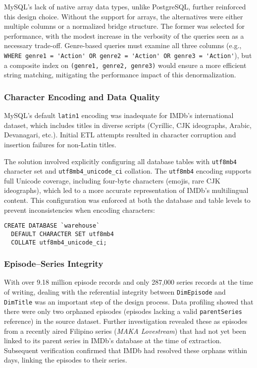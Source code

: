 MySQL's lack of native array data types, unlike PostgreSQL, further reinforced this design choice. Without the support for arrays, the alternatives were either multiple columns or a normalized bridge structure. The former was selected for performance, with the modest increase in the verbosity of the queries seen as a necessary trade-off. Genre-based queries must examine all three columns (e.g., \verb|WHERE genre1 = 'Action' OR genre2 = 'Action' OR genre3 = 'Action'|), but a composite index on \verb|(genre1, genre2, genre3)| would ensure a more efficient string matching, mitigating the performance impact of this denormalization.

\subsubsection{Character Encoding and Data Quality}

MySQL's default \verb|latin1| encoding was inadequate for IMDb's international dataset, which includes titles in diverse scripts (Cyrillic, CJK ideographs, Arabic, Devanagari, etc.). Initial ETL attempts resulted in character corruption and insertion failures for non-Latin titles.

The solution involved explicitly configuring all database tables with \verb|utf8mb4| character set and \verb|utf8mb4_unicode_ci| collation. The \verb|utf8mb4| encoding supports full Unicode coverage, including four-byte characters (emojis, rare CJK ideographs), which led to a more accurate representation of IMDb's multilingual content. This configuration was enforced at both the database and table levels to prevent inconsistencies when encoding characters: 

\begin{verbatim}
CREATE DATABASE `warehouse`
  DEFAULT CHARACTER SET utf8mb4
  COLLATE utf8mb4_unicode_ci;
\end{verbatim}

\subsubsection{Episode–Series Integrity}

With over 9.18 million episode records and only 287,000 series records at the time of writing, dealing with the referential integrity between \verb|DimEpisode| and \verb|DimTitle| was an important step of the design process. Data profiling showed that there were only two orphaned episodes (episodes lacking a valid \verb|parentSeries| reference) in the source dataset. Further investigation revealed these as episodes from a recently aired Filipino series (\textit{MAKA Lovestream}) that had not yet been linked to its parent series in IMDb's database at the time of extraction. Subsequent verification confirmed that IMDb had resolved these orphans within days, linking the episodes to their series.

